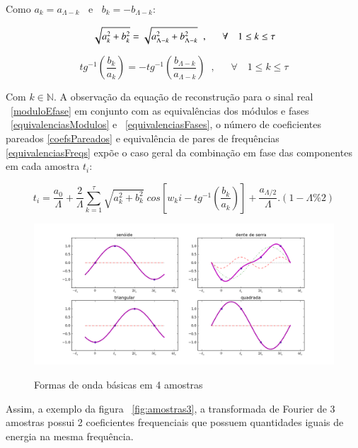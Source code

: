 Como $a_k = a_{\Lambda -k}\;\;$ e $\;\;b_k = - b_{\Lambda -k}$:

\begin{equation}\label{equivalenciasModulos}
\sqrt{a_k^2 + b_k^2} = \sqrt{a_{\Lambda - k}^2 + b_{\Lambda -k}^2} \;\;, \quad \;\; \forall \quad 1 \leq k \leq \tau  \\
\end{equation}

\begin{equation}\label{equivalenciasFases}
tg^{-1}\left(\frac{b_k}{a_k}\right)=-tg^{-1}\left(\frac{b_{\Lambda -k}}{a_{\Lambda - k}}\right)\;\;,\quad \;\; \forall \quad 1 \leq k \leq \tau
\end{equation}



Com $k \in \mathbb{N}$. A observação da equação de reconstrução para o sinal real ~\ref{moduloEfase} em conjunto com as equivalências dos módulos e fases ~\ref{equivalenciasModulos} e ~\ref{equivalenciasFases}, o número de coeficientes pareados \ref{coefsPareados} e equivalência de pares de frequências \ref{equivalenciasFreqs}
expõe o caso geral da combinação em fase das componentes em cada amostra $t_i$:

\begin{equation}
t_i = \frac{a_0}{\Lambda} + \frac{2}{\Lambda}\sum_{k=1}^{\tau}\sqrt{a_k^2 + b_k^2} \; cos\left[w_k i - tg^{-1}\left(\frac{b_k}{a_k}\right)\right]+ \frac{ a_{\Lambda/2}}{\Lambda}.(1-\Lambda\% 2)
\end{equation}

\begin{figure}[h!]
    \centering
    \caption{Formas de onda básicas em 4 amostras}
        \includegraphics[width=\textwidth]{figuras/amostras4formas__}
        \label{fig:formas4}
\end{figure}


Assim, a exemplo da figura ~\ref{fig:amostras3}, a transformada de Fourier de 3 amostras possui 2 coeficientes frequenciais que possuem quantidades iguais de energia na mesma frequência.


